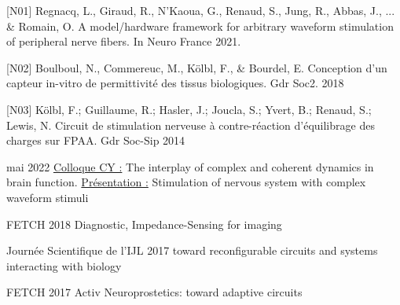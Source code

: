 \begin{cvskills}   
  \cvskill
    {[N01]} %
    {Regnacq, L., Giraud, R., N'Kaoua, G., Renaud, S., Jung, R., Abbas, J., ... \& Romain, O. A model/hardware framework for arbitrary waveform stimulation of peripheral nerve fibers. In Neuro France 2021. } %
\end{cvskills}
\begin{cvskills}   
  \cvskill
    {[N02]} %
    {Boulboul, N., Commereuc, M., Kölbl, F., \& Bourdel, E. Conception d’un capteur in-vitro de permittivité des tissus biologiques. Gdr Soc2. 2018} %
\end{cvskills}
\begin{cvskills}   
  \cvskill
    {[N03]} %
    {Kölbl, F.; Guillaume, R.; Hasler, J.; Joucla, S.; Yvert, B.; Renaud, S.; Lewis, N. Circuit de stimulation nerveuse à contre-réaction d’équilibrage des charges sur FPAA. Gdr Soc-Sip 2014} %
\end{cvskills}

\begin{cvskills}   
  \cvskill
     {mai 2022} %
    {\underline{Colloque CY :} The interplay of complex and coherent dynamics in brain function. \underline{Présentation :} Stimulation of nervous system with complex waveform stimuli} %
\end{cvskills}
\begin{cvskills}   
  \cvskill
    {FETCH 2018} %
    {Diagnostic, Impedance-Sensing for imaging} %
\end{cvskills}
\begin{cvskills}   
  \cvskill
    {Journée Scientifique de l’IJL 2017} %
    { toward reconfigurable circuits and systems interacting with biology} %
\end{cvskills}
\begin{cvskills}   
  \cvskill
    {FETCH 2017} %
    { Activ Neuroprostetics: toward adaptive circuits} %
\end{cvskills}